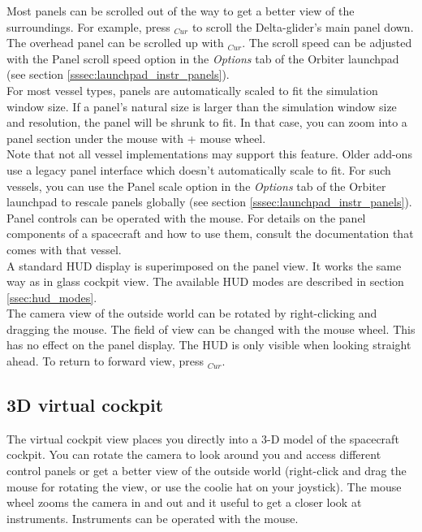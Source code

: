 \documentclass[Orbiter User Manual.tex]{subfiles}
\begin{document}
\noindent
Most panels can be scrolled out of the way to get a better view of the surroundings. For example, press \DArrow$_{Cur}$ to scroll the Delta-glider's main panel down. The overhead panel can be scrolled up with \UArrow$_{Cur}$. The scroll speed can be adjusted with the Panel scroll speed option in the \textit{Options} tab of the Orbiter launchpad (see section \ref{sssec:launchpad_instr_panels}).\\
For most vessel types, panels are automatically scaled to fit the simulation window size. If a panel's natural size is larger than the simulation window size and resolution, the panel will be shrunk to fit. In that case, you can zoom into a panel section under the mouse with \Ctrl + mouse wheel.\\
Note that not all vessel implementations may support this feature. Older add-ons use a legacy panel interface which doesn't automatically scale to fit. For such vessels, you can use the Panel scale option in the \textit{Options} tab of the Orbiter launchpad to rescale panels globally (see section \ref{sssec:launchpad_instr_panels}).\\
Panel controls can be operated with the mouse. For details on the panel components of a spacecraft and how to use them, consult the documentation that comes with that vessel.\\
A standard HUD display is superimposed on the panel view. It works the same way as in glass cockpit view. The available HUD modes are described in section \ref{ssec:hud_modes}.\\
The camera view of the outside world can be rotated by right-clicking and dragging the mouse. The field of view can be changed with the mouse wheel. This has no effect on the panel display. The HUD is only visible when looking straight ahead. To return to forward view, press \Home$_{Cur}$.


\subsection{3D virtual cockpit}
The virtual cockpit view places you directly into a 3-D model of the spacecraft cockpit. You can rotate the camera to look around you and access different control panels or get a better view of the outside world (right-click and drag the mouse for rotating the view, or use the coolie hat on your joystick). The mouse wheel zooms the camera in and out and it useful to get a closer look at instruments. Instruments can be operated with the mouse.
\end{document}
